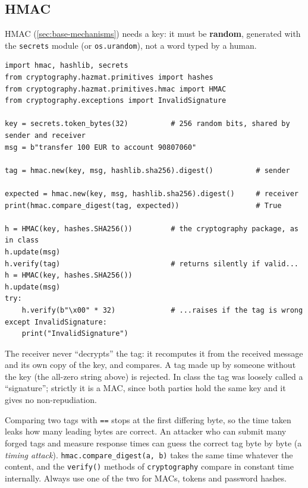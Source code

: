 \subsection{HMAC}

HMAC (\cref{sec:base-mechanisms}) needs a key: it must be \textbf{random}, generated with the \texttt{secrets} module (or \texttt{os.urandom}), not a word typed by a human.

\begin{verbatim}
import hmac, hashlib, secrets
from cryptography.hazmat.primitives import hashes
from cryptography.hazmat.primitives.hmac import HMAC
from cryptography.exceptions import InvalidSignature

key = secrets.token_bytes(32)          # 256 random bits, shared by sender and receiver
msg = b"transfer 100 EUR to account 90807060"

tag = hmac.new(key, msg, hashlib.sha256).digest()          # sender

expected = hmac.new(key, msg, hashlib.sha256).digest()     # receiver
print(hmac.compare_digest(tag, expected))                  # True

h = HMAC(key, hashes.SHA256())         # the cryptography package, as in class
h.update(msg)
h.verify(tag)                          # returns silently if valid...
h = HMAC(key, hashes.SHA256())
h.update(msg)
try:
    h.verify(b"\x00" * 32)             # ...raises if the tag is wrong
except InvalidSignature:
    print("InvalidSignature")
\end{verbatim}

The receiver never \enquote{decrypts} the tag: it recomputes it from the received message and its own copy of the key, and compares. A tag made up by someone without the key (the all-zero string above) is rejected. In class the tag was loosely called a \enquote{signature}; strictly it is a MAC, since both parties hold the same key and it gives no non-repudiation.

\begin{definition}
Comparing two tags with \texttt{==} stops at the first differing byte, so the time taken leaks how many leading bytes are correct. An attacker who can submit many forged tags and measure response times can guess the correct tag byte by byte (a \emph{timing attack}). \texttt{hmac.compare_digest(a, b)} takes the same time whatever the content, and the \texttt{verify()} methods of \texttt{cryptography} compare in constant time internally. Always use one of the two for MACs, tokens and password hashes.
\end{definition}

